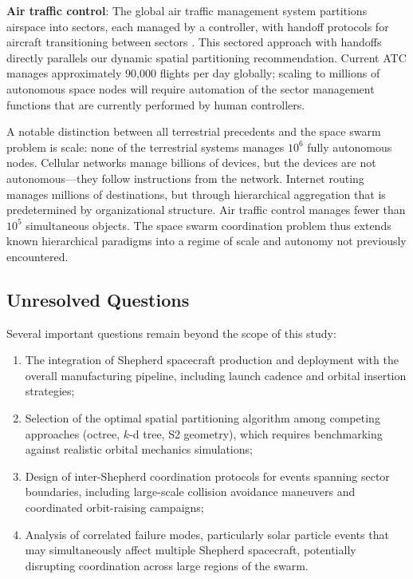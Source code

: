 \documentclass[journal]{IEEEtran}
\begin{document}
\textbf{Air traffic control}: The global air traffic management system partitions airspace into sectors, each managed by a controller, with handoff protocols for aircraft transitioning between sectors \cite{icao_atm}. This sectored approach with handoffs directly parallels our dynamic spatial partitioning recommendation. Current ATC manages approximately 90{,}000 flights per day globally; scaling to millions of autonomous space nodes will require automation of the sector management functions that are currently performed by human controllers.

A notable distinction between all terrestrial precedents and the space swarm problem is scale: none of the terrestrial systems manages $10^6$ fully autonomous nodes. Cellular networks manage billions of devices, but the devices are not autonomous---they follow instructions from the network. Internet routing manages millions of destinations, but through hierarchical aggregation that is predetermined by organizational structure. Air traffic control manages fewer than $10^5$ simultaneous objects. The space swarm coordination problem thus extends known hierarchical paradigms into a regime of scale and autonomy not previously encountered.

\subsection{Unresolved Questions}

Several important questions remain beyond the scope of this study:

\begin{enumerate}
    \item The integration of Shepherd spacecraft production and deployment with the overall manufacturing pipeline, including launch cadence and orbital insertion strategies;
    \item Selection of the optimal spatial partitioning algorithm among competing approaches (octree, $k$-d tree, S2 geometry), which requires benchmarking against realistic orbital mechanics simulations;
    \item Design of inter-Shepherd coordination protocols for events spanning sector boundaries, including large-scale collision avoidance maneuvers and coordinated orbit-raising campaigns;
    \item Analysis of correlated failure modes, particularly solar particle events that may simultaneously affect multiple Shepherd spacecraft, potentially disrupting coordination across large regions of the swarm.
\end{enumerate}
\end{document}

